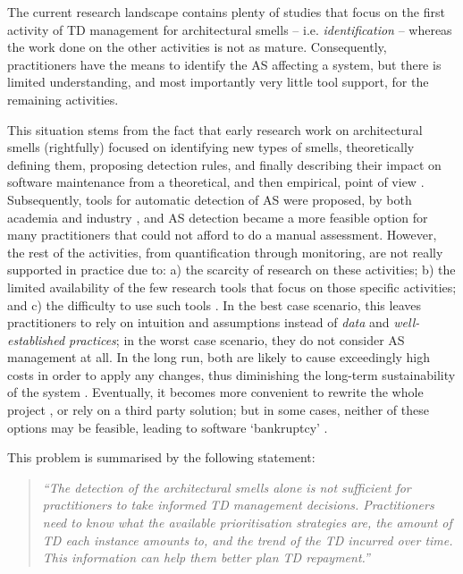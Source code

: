 The current research landscape contains plenty of studies that focus on the first activity of TD management for architectural smells -- i.e.  \emph{identification} -- whereas the work done on the other activities is not as mature.
Consequently, practitioners have the means to identify the AS affecting a system, but there is limited understanding, and most importantly very little tool support, for the remaining activities.

This situation stems from the fact that early research work on architectural smells (rightfully) focused on identifying new types of smells, theoretically defining them, proposing detection rules, and finally describing their impact on software maintenance from a theoretical, and then empirical, point of view \cite{Lippert2006,Garcia2009,Mo2015,Le2016,Arcelli2016}.
Subsequently, tools for automatic detection of AS were proposed, by both academia and industry \cite{Avgeriou2021,Khomyakov2020}, and AS detection became a more feasible option for many practitioners that could not afford to do a manual assessment.
However, the rest of the activities, from quantification through monitoring, are not really supported in practice due to: a) the scarcity of research on these activities; b) the limited availability of the few research tools that focus on those specific activities; and c) the difficulty to use such tools \cite{Khomyakov2020}.
In the best case scenario, this leaves practitioners to rely on intuition and assumptions instead of \emph{data} and \emph{well-established practices}; in the worst case scenario, they do not consider AS management at all.
In the long run, both are likely to cause exceedingly high costs in order to apply any changes, thus diminishing the long-term sustainability of the system \cite{Winters2020}. 
Eventually, it becomes more convenient to rewrite the whole project \cite{Lehman1979}, or rely on a third party solution; but in some cases, neither of these options may be feasible, leading to software `bankruptcy' \cite{Ampatzoglou2015}.

This problem is summarised by the following statement:
\begin{quote}\itshape
    ``The detection of the architectural smells alone is not sufficient for practitioners to take informed TD management decisions.
    Practitioners need to know what the available prioritisation strategies are, the amount of TD each instance amounts to, and the trend of the TD incurred over time. This information can help them better plan TD repayment.''
\end{quote}

